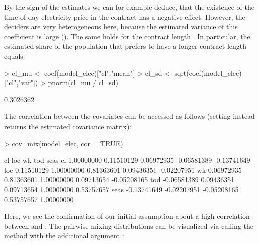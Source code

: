 \documentclass[article]{jss}
\newcommand{\fct}[1]{\code{#1()}}
\begin{document}
By the sign of the estimates we can for example deduce, that the existence of the time-of-day electricity price  in the contract has a negative effect. However, the deciders are very heterogeneous here, because the estimated variance of this coefficient is large (). The same holds for the contract length . In particular, the estimated share of the population that prefers to have a longer contract length equals:

\begin{Schunk}
\begin{Sinput}
> cl_mu <- coef(model_elec)["cl","mean"]
> cl_sd <- sqrt(coef(model_elec)["cl","var"])
> pnorm(cl_mu / cl_sd)
\end{Sinput}
\begin{Soutput}
[1] 0.3026362
\end{Soutput}
\end{Schunk}

The correlation between the covariates can be accessed as follows (setting  instead returns the estimated covariance matrix):

\begin{Schunk}
\begin{Sinput}
> cov_mix(model_elec, cor = TRUE)
\end{Sinput}
\begin{Soutput}
              cl         loc          wk         tod        seas
cl    1.00000000  0.11510129  0.06972935 -0.06581389 -0.13741649
loc   0.11510129  1.00000000  0.81363601  0.09436351 -0.02207951
wk    0.06972935  0.81363601  1.00000000  0.09713654 -0.05208165
tod  -0.06581389  0.09436351  0.09713654  1.00000000  0.53757657
seas -0.13741649 -0.02207951 -0.05208165  0.53757657  1.00000000
\end{Soutput}
\end{Schunk}

Here, we see the confirmation of our initial assumption about a high correlation between  and . The pairwise mixing distributions can be visualized via calling the \fct{plot} method with the additional argument :
\end{document}
